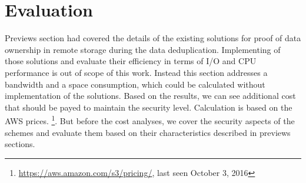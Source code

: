 \documentclass[12pt]{article}
\begin{document}
\pagebreak

\section{Evaluation}
\label{sec:5}
Previews section had covered the details of the existing solutions for proof of data ownership in remote storage during the data deduplication. Implementing of those solutions and evaluate their efficiency in terms of I/O and CPU performance is out of scope of this work. Instead this section addresses a bandwidth and a space consumption, which could be calculated without implementation of the solutions. Based on the results, we can see additional cost that should be payed to maintain the security level. Calculation is  based on the AWS prices. \footnote{\url{https://aws.amazon.com/s3/pricing/}, last seen October 3, 2016}. But before the cost analyses, we cover the security aspects of the schemes and evaluate them based on their characteristics described in previews sections.
\end{document}
